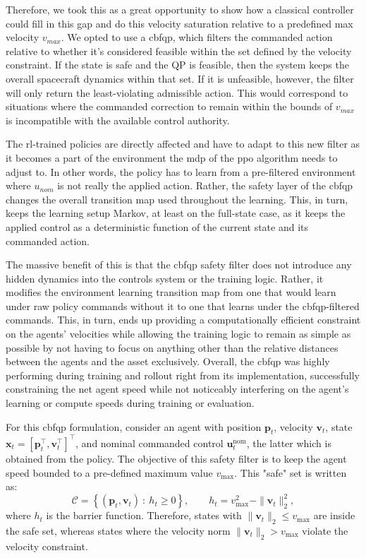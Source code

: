 Therefore, we took this as a great opportunity to show how a classical controller could fill in this gap and do this velocity saturation relative to a predefined max velocity $v_{max}$. We opted to use a \acs{cbfqp}, which filters the commanded action relative to whether it's considered feasible within the set defined by the velocity constraint. If the state is safe and the QP is feasible, then the system keeps the overall spacecraft dynamics within that set. If it is unfeasible, however, the filter will only return the least-violating admissible action. This would correspond to situations where the commanded correction to remain within the bounds of $v_{max}$ is incompatible with the available control authority.

The \acs{rl}-trained policies are directly affected and have to adapt to this new filter as it becomes a part of the environment the \acs{mdp} of the \acs{ppo} algorithm needs to adjust to. In other words, the policy has to learn from a pre-filtered environment where $u_{nom}$ is not really the applied action. Rather, the safety layer of the \acs{cbfqp} changes the overall transition map used throughout the learning. This, in turn, keeps the learning setup Markov, at least on the full-state case, as it keeps the applied control as a deterministic function of the current state and its commanded action. 

The massive benefit of this is that the \acs{cbfqp} safety filter does not introduce any hidden dynamics into the controls system or the training logic. Rather, it modifies the environment learning transition map from one that would learn under raw policy commands without it to one that learns under the \acs{cbfqp}-filtered commands. This, in turn, ends up providing a computationally efficient constraint on the agents' velocities while allowing the training logic to remain as simple as possible by not having to focus on anything other than the relative distances between the agents and the asset exclusively. Overall, the \acs{cbfqp} was highly performing during training and rollout right from its implementation, successfully constraining the net agent speed while not noticeably interfering on the agent's learning or compute speeds during training or evaluation. 

For this \acs{cbfqp} formulation, consider an agent with position $\mathbf{p}_t$, velocity $\mathbf{v}_t$, state $\mathbf{x}_t=[\mathbf{p}_t^\top,\mathbf{v}_t^\top]^\top$, and nominal commanded control $\mathbf{u}^{\mathrm{nom}}_t$, the latter which is obtained from the policy. The objective of this safety filter is to keep the agent speed bounded to a pre-defined maximum value $v_{\max}$. This "safe" set is written as:
\[
\mathcal{C} = \left\{(\mathbf{p}_t,\mathbf{v}_t)\ :\ h_t \ge 0 \right\},
\qquad
h_t = v_{\max}^2 - \|\mathbf{v}_t\|_2^2,
\]
where $h_t$ is the barrier function. Therefore, states with $\|\mathbf{v}_t\|_2 \le v_{\max}$ are inside the safe set, whereas states where the velocity norm $\|\mathbf{v}_t\|_2 > v_{\max}$ violate the velocity constraint.

